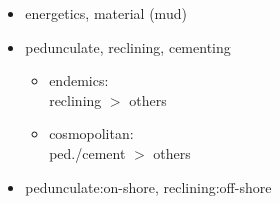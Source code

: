 \documentclass{beamer}
\begin{document}
\begin{frame}
\begin{columns}
\begin{column}{0.5\textwidth}
\begin{center}
        \tiny{}
      \end{center}
    \end{column}
    \begin{column}{0.5\textwidth}
      \begin{itemize}
        \item energetics, material (mud)
        \item pedunculate, reclining, cementing
          \begin{itemize}
            \item endemics: \\reclining \(>\) others
            \item cosmopolitan: \\ped./cement \(>\) others
          \end{itemize}
        \item pedunculate:on-shore, reclining:off-shore
      \end{itemize}
    \end{column}
  \end{columns}
\end{frame}
\end{document}
